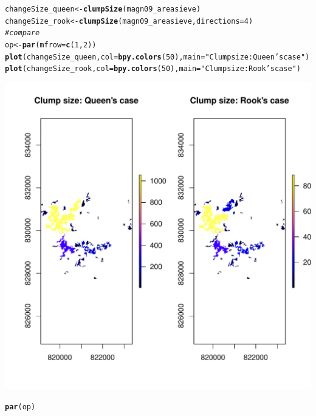 \documentclass{article}\usepackage[]{graphicx}\usepackage[]{color}
\makeatletter
\def\maxwidth{ %
  \ifdim\Gin@nat@width>\linewidth
    \linewidth
  \else
    \Gin@nat@width
  \fi
}
\newcommand{\hlnum}[1]{\textcolor[rgb]{0.686,0.059,0.569}{#1}}%
\newcommand{\hlstr}[1]{\textcolor[rgb]{0.192,0.494,0.8}{#1}}%
\newcommand{\hlcom}[1]{\textcolor[rgb]{0.678,0.584,0.686}{\textit{#1}}}%
\newcommand{\hlstd}[1]{\textcolor[rgb]{0.345,0.345,0.345}{#1}}%
\newcommand{\hlkwb}[1]{\textcolor[rgb]{0.69,0.353,0.396}{#1}}%
\newcommand{\hlkwc}[1]{\textcolor[rgb]{0.333,0.667,0.333}{#1}}%
\newcommand{\hlkwd}[1]{\textcolor[rgb]{0.737,0.353,0.396}{\textbf{#1}}}%
\newenvironment{kframe}{%
 \def\at@end@of@kframe{}%
 \ifinner\ifhmode%
  \def\at@end@of@kframe{\end{minipage}}%
  \begin{minipage}{\columnwidth}%
 \fi\fi%
 \def\FrameCommand##1{\hskip\@totalleftmargin \hskip-\fboxsep
 \colorbox{shadecolor}{##1}\hskip-\fboxsep
     \hskip-\linewidth \hskip-\@totalleftmargin \hskip\columnwidth}%
 \MakeFramed {\advance\hsize-\width
   \@totalleftmargin\z@ \linewidth\hsize
   \@setminipage}}%
 {\par\unskip\endMakeFramed%
 \at@end@of@kframe}
\newenvironment{knitrout}{}{} %
\makeatother
\begin{document}
\begin{knitrout}
\color{fgcolor}\begin{kframe}
\begin{alltt}
\hlstd{changeSize_queen} \hlkwb{<-} \hlkwd{clumpSize}\hlstd{(magn09_areasieve)}
\hlstd{changeSize_rook} \hlkwb{<-} \hlkwd{clumpSize}\hlstd{(magn09_areasieve,} \hlkwc{directions} \hlstd{=} \hlnum{4}\hlstd{)}
\hlcom{# compare}
\hlstd{op} \hlkwb{<-} \hlkwd{par}\hlstd{(}\hlkwc{mfrow} \hlstd{=} \hlkwd{c}\hlstd{(}\hlnum{1}\hlstd{,} \hlnum{2}\hlstd{))}
\hlkwd{plot}\hlstd{(changeSize_queen,} \hlkwc{col} \hlstd{=} \hlkwd{bpy.colors}\hlstd{(}\hlnum{50}\hlstd{),} \hlkwc{main} \hlstd{=} \hlstr{"Clump size: Queen's case"}\hlstd{)}
\hlkwd{plot}\hlstd{(changeSize_rook,} \hlkwc{col} \hlstd{=} \hlkwd{bpy.colors}\hlstd{(}\hlnum{50}\hlstd{),} \hlkwc{main} \hlstd{=} \hlstr{"Clump size: Rook's case"}\hlstd{)}
\end{alltt}
\end{kframe}
\includegraphics[width=\maxwidth]{figure/clumpSize} 
\begin{kframe}\begin{alltt}
\hlkwd{par}\hlstd{(op)}
\end{alltt}
\end{kframe}
\end{knitrout}
\end{document}
